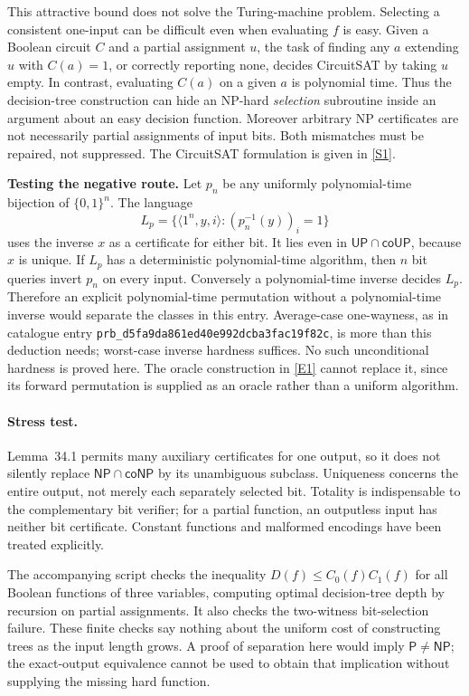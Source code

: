 \documentclass[11pt,a4paper]{article}
\newcommand{\sref}[2]{\hyperlink{source:#1:#2}{[S#2]}}
\newcommand{\eref}[2]{\hyperlink{extra:#1:#2}{[E#2]}}
\numberwithin{equation}{section}
\begin{document}
This attractive bound does not solve the Turing-machine problem. Selecting
a consistent one-input can be difficult even when evaluating $f$ is easy.
Given a Boolean circuit $C$ and a partial assignment $u$, the task of finding
any $a$ extending $u$ with $C(a)=1$, or correctly reporting none, decides
CircuitSAT by taking $u$ empty. In contrast, evaluating $C(a)$ on a given
$a$ is polynomial time. Thus the decision-tree construction can hide an
NP-hard \emph{selection} subroutine inside an argument about an easy decision
function. Moreover arbitrary NP certificates are not necessarily partial
assignments of input bits. Both mismatches must be repaired, not suppressed.
The CircuitSAT formulation is given in \sref{statement}{1}.

\medskip
\textbf{Testing the negative route.}
Let $p_n$ be any uniformly polynomial-time bijection of $\{0,1\}^n$.
The language
\[
 L_p=\{\langle1^n,y,i\rangle:(p_n^{-1}(y))_i=1\}
\]
uses the inverse $x$ as a certificate for either bit. It lies even in
$\mathsf{UP}\cap\mathsf{coUP}$, because $x$ is unique. If $L_p$ has a
deterministic polynomial-time algorithm, then $n$ bit queries invert $p_n$
on every input. Conversely a polynomial-time inverse decides $L_p$.
Therefore an explicit polynomial-time permutation without a polynomial-time
inverse would separate the classes in this entry. Average-case one-wayness,
as in catalogue entry \texttt{prb\_d5fa9da861ed40e992dcba3fac19f82c}, is more than this deduction needs; worst-case inverse
hardness suffices. No such unconditional hardness is proved here. The
oracle construction in \eref{statement}{1} cannot replace it, since its forward
permutation is supplied as an oracle rather than a uniform algorithm.

\paragraph{Stress test.}
Lemma~34.1 permits many auxiliary certificates for one output, so it does not
silently replace $\mathsf{NP}\cap\mathsf{coNP}$ by its unambiguous subclass.
Uniqueness concerns the entire output, not merely each separately selected
bit. Totality is indispensable to the complementary bit verifier; for a
partial function, an outputless input has neither bit certificate. Constant
functions and malformed encodings have been treated explicitly.

The accompanying script checks the inequality $D(f)\le C_0(f)C_1(f)$ for
all Boolean functions of three variables, computing optimal decision-tree
depth by recursion on partial assignments. It also checks the two-witness
bit-selection failure. These finite checks say nothing about the uniform
cost of constructing trees as the input length grows. A proof of separation
here would imply $\mathsf P\ne\mathsf{NP}$; the exact-output equivalence
cannot be used to obtain that implication without supplying the missing
hard function.
\end{document}
